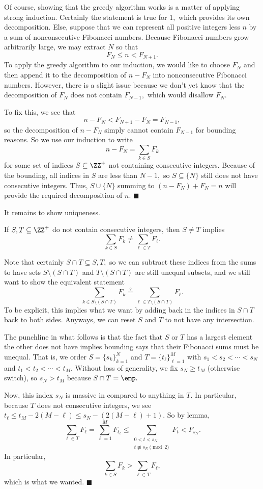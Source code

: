 Of course, showing that the greedy algorithm works is a matter of applying strong induction. Certainly the statement is true for $1,$ which provides its own decomposition. Else, suppose that we can represent all positive integers less $n$ by a sum of nonconsecutive Fibonacci numbers. Because Fibonacci numbers grow arbitrarily large, we may extract $N$ so that
\[F_N\le n<F_{N+1}.\]
To apply the greedy algorithm to our induction, we would like to choose $F_N$ and then append it to the decomposition of $n-F_N$ into nonconsecutive Fibonacci numbers. However, there is a slight issue because we don't yet know that the decomposition of $F_N$ does not contain $F_{N-1},$ which would disallow $F_N.$

To fix this, we see that
\[n-F_N<F_{N+1}-F_N=F_{N-1},\]
so the decomposition of $n-F_N$ simply cannot contain $F_{N-1}$ for bounding reasons. So we use our induction to write
\[n-F_N=\sum_{k\in S}F_k\]
for some set of indices $S\subseteq\ZZ^+$ not containing consecutive integers. Because of the bounding, all indices in $S$ are less than $N-1,$ so $S\subseteq\{N\}$ still does not have consecutive integers. Thus, $S\cup\{N\}$ summing to $(n-F_N)+F_N=n$ will provide the required decomposition of $n.$ $\blacksquare$

It remains to show uniqueness.
\begin{lemma}
    If $S,T\subseteq\ZZ^+$ do not contain consecutive integers, then $S\ne T$ implies
    \[\sum_{k\in S}F_k\ne\sum_{\ell\in T}F_\ell.\]
\end{lemma}
Note that certainly $S\cap T\subseteq S,T,$ so we can subtract these indices from the sums to have sets $S\setminus(S\cap T)$ and $T\setminus(S\cap T)$ are still unequal subsets, and we still want to show the equivalent statement
\[\sum_{k\in S\setminus(S\cap T)}F_k\stackrel?=\sum_{\ell\in T\setminus(S\cap T)}F_\ell.\]
To be explicit, this implies what we want by adding back in the indices in $S\cap T$ back to both sides. Anyways, we can reset $S$ and $T$ to not have any intersection.

The punchline in what follows is that the fact that $S$ or $T$ has a largest element the other does not have implies bounding says that their Fibonacci sums must be unequal. That is, we  order $S=\{s_k\}_{k=1}^N$ and $T=\{t_\ell\}_{\ell=1}^M$ with $s_1<s_2<\cdots<s_N$ and $t_1<t_2<\cdots<t_M.$ Without loss of generality, we fix $s_N\ge t_M$ (otherwise switch), so $s_N>t_M$ because $S\cap T=\emp.$

Now, this index $s_N$ is massive in compared to anything in $T.$ In particular, because $T$ does not consecutive integers, we see $t_\ell\le t_M-2(M-\ell)\le s_N-(2(M-\ell)+1).$ So by lemma,
\[\sum_{\ell\in T}F_\ell=\sum_{\ell=1}^MF_{t_\ell}\le\sum_{\substack{0<t<s_N\\t\not\equiv s_N\pmod2}}F_t<F_{s_N}.\]
In particular,
\[\sum_{k\in S}F_k>\sum_{\ell\in T}F_\ell,\]
which is what we wanted. $\blacksquare$

